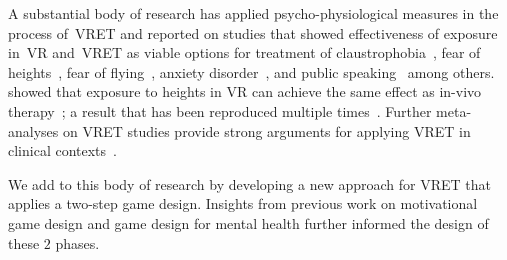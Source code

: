 A substantial body of research has applied psycho-physiological measures in the process of~\ac{VRET} and reported on studies that showed effectiveness of exposure in~\ac{VR} and~\ac{VRET} as viable options for treatment of claustrophobia~\cite{botella1999, malbos2008}, fear of heights~\cite{diemer2016,freeman2018,hodges1995,krijn2004}, fear of flying~\cite{krijn2007a}, %
anxiety disorder~\cite{gorini2008,krijn2004a}, and public speaking~\cite{koller2019} among others.
\citeauthor{emmelkamp2001} showed that exposure to heights in \ac{VR} can achieve the same effect as in-vivo therapy~\cite{emmelkamp2001}; a result that has been reproduced multiple times~\cite{coelho2009, klinger2005, muhlberger2003, powers2008}. Further meta-analyses on \ac{VRET} studies provide strong arguments for applying \ac{VRET} in clinical contexts~\cite{botella2017,gregg2007,coelho2009,powers2008,garcia-palacios2007}.

We add to this body of research by developing a new approach for \ac{VRET} that applies a two-step game design. Insights from previous work on motivational game design and game design for mental health further informed the design of these $2$ phases.


